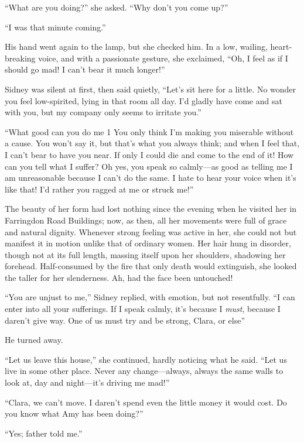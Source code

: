 ``What are you doing?'' she asked. ``Why don't you come up?''

``I was that minute coming.''

His hand went again to the lamp, but she checked him. In a low, wailing,
heart-breaking voice, and with a passionate gesture, she exclaimed,
``Oh, I feel as if I should go mad! I can't bear it much longer!''

Sidney was silent at first, then said quietly, ``Let's sit here for a
little. No wonder you feel low-spirited, lying in that room all day. I'd
gladly have come and sat with you, but my company only seems to irritate
you.''

``What good can you do me 1 You only think I'm making you miserable
without a cause. You won't say it, but that's what you always think; and
when I feel that, I can't bear to have you near. If only I could die and
come to the end of it! How can you tell what I suffer? Oh yes, you speak
so calmly---as good as telling me I am
{\protect\hypertarget{276}{}{}}unreasonable because I can't do the same.
I hate to hear your voice when it's like that! I'd rather you ragged at
me or struck me!''

The beauty of her form had lost nothing since the evening when he
visited her in Farringdon Road Buildings; now, as then, all her
movements were full of grace and natural dignity. Whenever strong
feeling was active in her, she could not but manifest it in motion
unlike that of ordinary women. Her hair hung in disorder, though not at
its full length, massing itself upon her shoulders, shadowing her
forehead. Half-consumed by the fire that only death would extinguish,
she looked the taller for her slenderness. Ah, had the face been
untouched!

``You are unjust to me,'' Sidney replied, with emotion, but not
resentfully. ``I can enter into all your sufferings. If I speak calmly,
it's because I \emph{must}, because I daren't give way. One of us must
try and be strong, Clara, or else''

He turned away.

``Let us leave this house,'' she continued, hardly noticing what he
said. ``Let us live in some other place. Never any
{\protect\hypertarget{277}{}{}}change---always, always the same walls to
look at, day and night---it's driving me mad!''

``Clara, we can't move. I daren't spend even the little money it would
cost. Do you know what Amy has been doing?''

``Yes; father told me.''

